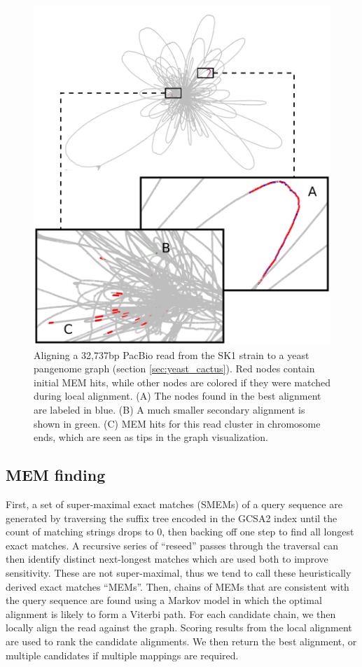\begin{figure}[htbp!]
\centering
\includegraphics[width=1.0\textwidth]{Chapter2/Figs/mapping_cactus_pacbio_aln_vizzy.pdf}
\caption[Alignment of a PacBio read to a yeast pangenome]{
  Aligning a 32,737bp PacBio read from the SK1 strain to a yeast pangenome graph (section \ref{sec:yeast_cactus}).
  Red nodes contain initial MEM hits, while other nodes are colored if they were matched during local alignment.
  (A) The nodes found in the best alignment are labeled in blue.
  (B) A much smaller secondary alignment is shown in green.
  (C) MEM hits for this read cluster in chromosome ends, which are seen as tips in the graph visualization.
}
\label{fig:alignment_to_cactus_yeast}
\end{figure}

\subsection{MEM finding}
First, a set of super-maximal exact matches (SMEMs) of a query sequence are generated by traversing the suffix tree encoded in the GCSA2 index until the count of matching strings drops to 0, then backing off one step to find all longest exact matches. 
A recursive series of ``reseed'' passes through the traversal can then identify distinct next-longest matches which are used both to improve sensitivity.
These are not super-maximal, thus we tend to call these heuristically derived exact matches ``MEMs''.
Then, chains of MEMs that are consistent with the query sequence are found using a Markov model in which the optimal alignment is likely to form a Viterbi path.
For each candidate chain, we then locally align the read against the graph. 
Scoring results from the local alignment are used to rank the candidate alignments.
We then return the best alignment, or multiple candidates if multiple mappings are required.

